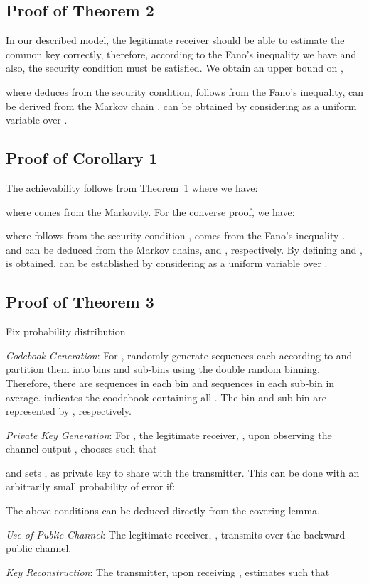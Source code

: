 \documentclass[conference,8pt]{IEEEtran}
\begin{document}
{{{{\subsection{Proof of Theorem 2}\label{sec:sec52}{
In our described model, the legitimate receiver should be able to estimate the common key  correctly, therefore, according to the Fano's inequality we have  and also, the security condition  must be satisfied.
We obtain an upper bound on ,

where  deduces from the security condition,  follows from the Fano's inequality,  can be derived from the Markov chain .  can be obtained by considering  as a uniform variable over .
}
\subsection{Proof of Corollary 1}\label{sec:sec53}{
The achievability follows from Theorem~1 where we have:

where  comes from the Markovity. For the converse proof, we have:

where  follows from the security condition ,  comes from the Fano's inequality .  and  can be deduced from the Markov chains,      and     , respectively. By defining  and ,  is obtained.  can be established by considering  as a uniform variable over .
\subsection{Proof of Theorem 3}\label{sec:sec54}{
Fix probability distribution  

\emph{Codebook Generation}: For , randomly generate  sequences  each according to  and partition them into  bins and  sub-bins using the double random binning. Therefore, there are  sequences  in each bin and  sequences  in each sub-bin in average.  indicates the coodebook containing all . The bin  and sub-bin  are represented by , respectively.

\emph{Private Key Generation}: For , the legitimate receiver, , upon observing the channel output , chooses  such that

and sets , as private key  to share with the  transmitter. 
This can be done with an arbitrarily small probability of error if:

The above conditions can be deduced directly from the covering lemma.

\emph{Use of Public Channel}: The legitimate receiver, , transmits  over the backward public channel.

\emph{Key Reconstruction}: The  transmitter, upon receiving , estimates  such that

}}}}}}
\end{document}
